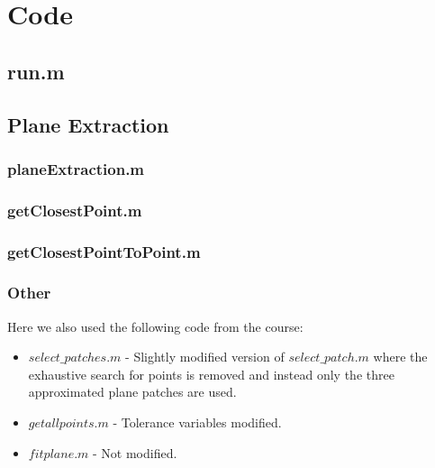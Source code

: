 \section{Code}
\subsection{run.m}\label{runCode}



\subsection{Plane Extraction}\label{PlaneExtractionCode}

\subsubsection{planeExtraction.m}\label{planeExtractionCode}


\subsubsection{getClosestPoint.m}\label{getClosestPointCode}


\subsubsection{getClosestPointToPoint.m}\label{getClosestPointToPointCode}


\subsubsection{Other}\label{OtherCode}
Here we also used the following code from the course:
\begin{itemize}
	\item $select\_patches.m$ - Slightly modified version of $select\_patch.m$ where the exhaustive search for points is removed and instead only the three approximated plane patches are used.
	\item $getallpoints.m$ - Tolerance variables modified.
	\item $fitplane.m$ - Not modified.
\end{itemize}



